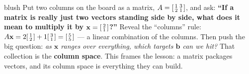 \documentclass[10pt]{article}
\newcommand{\xx}{\mathbf{x}}
\newcommand{\bb}{\mathbf{b}}
\begin{document}
\begin{skillbox}[Hook]{blush}
    Put two columns on the board as a matrix,
    $A=\begin{bsmallmatrix} 1 & 3 \\ 2 & 1 \end{bsmallmatrix}$, and ask:
    \textbf{``If a matrix is really just two vectors standing side by side, what does it mean to
    multiply it by $\xx=\begin{bsmallmatrix} 2\\1 \end{bsmallmatrix}$?''} Reveal the ``columns''
    rule: $A\xx = 2\begin{bsmallmatrix} 1\\2 \end{bsmallmatrix} + 1\begin{bsmallmatrix} 3\\1 \end{bsmallmatrix}
    = \begin{bsmallmatrix} 5\\5 \end{bsmallmatrix}$ --- a linear combination of the columns.
    Then push the big question: \emph{as $\xx$ ranges over everything, which targets $\bb$ can we
    hit?} That collection is the \textbf{column space}. This frames the lesson: a matrix packages
    vectors, and its column space is everything they can build.
\end{skillbox}
\end{document}
